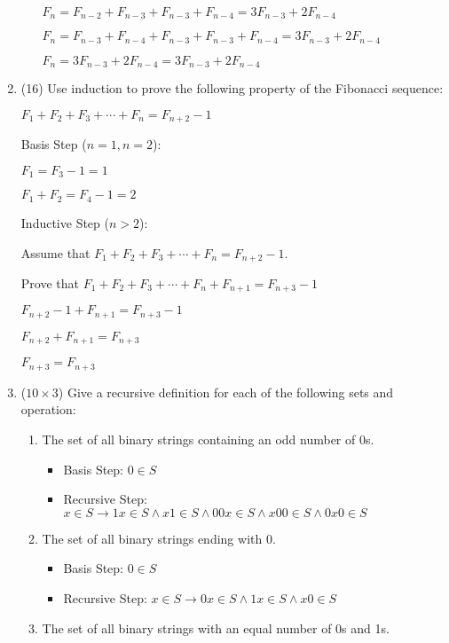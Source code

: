 \documentclass[12pt]{article}
\begin{document}
\begin{enumerate}
\begin{enumerate}
	$F_n = F_{n-2} + F_{n-3} + F_{n-3} + F_{n-4} = 3F_{n-3} + 2F_{n-4}$

	$F_n = F_{n-3} + F_{n-4} + F_{n-3} + F_{n-3} + F_{n-4} = 3F_{n-3} + 2F_{n-4}$

	$F_n = 3F_{n-3} + 2F_{n-4} = 3F_{n-3} + 2F_{n-4}$
\end{enumerate}

	\newpage
	\item (16)
	Use induction to prove the following property of the Fibonacci sequence:

	$F_1 + F_2 + F_3 + \cdots + F_n = F_{n+2} - 1$

	Basis Step ($n = 1, n = 2$):

	$F_1 = F_3 - 1 = 1$

	$F_1 + F_2 = F_4 - 1 = 2$

	Inductive Step ($n > 2$):

	Assume that $F_1 + F_2 + F_3 + \cdots + F_n = F_{n+2} - 1$.

	Prove that $F_1 + F_2 + F_3 + \cdots + F_n + F_{n+1} = F_{n+3} - 1$

	$F_{n+2} - 1 + F_{n+1} = F_{n+3} - 1$

	$F_{n+2} + F_{n+1} = F_{n+3}$

	$F_{n+3} = F_{n+3}$

	\newpage
	\item ($10 \times 3$)
	Give a recursive definition for each of the following sets and operation:
	\begin{enumerate}
		\item
		The set of all binary strings containing an odd number of 0s.

		\begin{itemize}
			\item Basis Step: $0 \in S$
			\item Recursive Step: $x \in S \to 1x \in S \land x1 \in S \land 00x \in S \land x00 \in S \land 0x0 \in S$
		\end{itemize}
		\item
		The set of all binary strings ending with 0.

		\begin{itemize}
			\item Basis Step: $0 \in S$
			\item Recursive Step: $x \in S \to 0x \in S \land 1x \in S \land x0 \in S$
		\end{itemize}
		\item
		The set of all binary strings with an equal number of 0s and 1s.


\end{enumerate}
\end{enumerate}
\end{document}
